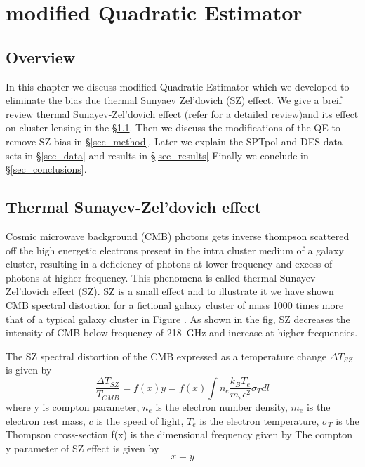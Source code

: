 \chapter{modified Quadratic Estimator}
\label{ch:analysis}
\section*{Overview}\label{ovr}
In this chapter we discuss modified Quadratic Estimator which we developed to eliminate the bias due thermal Sunyaev Zel'dovich (SZ) effect. 
We give a breif review thermal Sunayev-Zel'dovich effect (refer  for a detailed review)and its effect on cluster lensing in the \S\ref{tsz}.
Then we discuss the modifications of the QE to remove SZ bias in \S\ref{sec_method}.
 Later we explain the SPTpol and DES data sets in \S\ref{sec_data} and results in \S\ref{sec_results}
Finally we conclude in \S\ref{sec_conclusions}.


\section{Thermal Sunayev-Zel'dovich effect}\label{tsz}

 Cosmic microwave background (CMB) photons gets inverse thompson scattered off the high energetic electrons present in the intra cluster medium of a galaxy cluster, resulting in a deficiency of photons at lower frequency and excess of photons at higher frequency. 
 This phenomena is called thermal Sunayev-Zel'dovich effect (SZ). 
 SZ is a small effect and to illustrate it we have shown CMB spectral distortion for a fictional galaxy cluster of mass 1000 times more that of a typical galaxy cluster in Figure .
 As shown in the fig, SZ decreases the intensity of CMB below frequency of 218 \,GHz and increase at higher frequencies. 
   
The SZ spectral distortion of the CMB expressed as a temperature change $\Delta T_{SZ}$ is given by 
\begin{equation}
\frac{\Delta T_{SZ}}{T_{CMB}} = f(x) y = f(x) \int n_{e} \frac{k_{B}T_{e}}{m_{e}c^{2}} \sigma_{T} dl
\end{equation}
where y is compton parameter, $n_{e}$ is the electron number density, $m_{e}$ is the electron rest mass, $c$ is the speed of light,  $T_{e}$ is the electron temperature, $\sigma_{T}$ is the Thompson cross-section f(x) is the dimensional frequency given by 
 The compton y parameter of SZ effect is given by 
 \begin{equation}
 x = y
 \end{equation}
 
